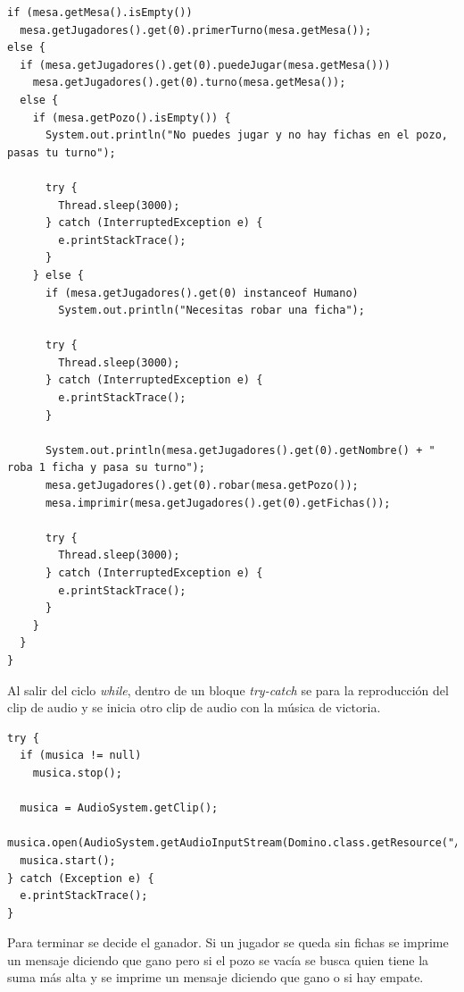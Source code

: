 \documentclass[12pt]{article}
\begin{document}
  \begin{lstlisting}
if (mesa.getMesa().isEmpty())
  mesa.getJugadores().get(0).primerTurno(mesa.getMesa());
else {
  if (mesa.getJugadores().get(0).puedeJugar(mesa.getMesa())) 
    mesa.getJugadores().get(0).turno(mesa.getMesa());
  else { 
    if (mesa.getPozo().isEmpty()) { 
      System.out.println("No puedes jugar y no hay fichas en el pozo, pasas tu turno");

      try {
        Thread.sleep(3000);
      } catch (InterruptedException e) {
        e.printStackTrace();
      }
    } else {
      if (mesa.getJugadores().get(0) instanceof Humano)
        System.out.println("Necesitas robar una ficha");

      try {
        Thread.sleep(3000);
      } catch (InterruptedException e) {
        e.printStackTrace();
      }

      System.out.println(mesa.getJugadores().get(0).getNombre() + " roba 1 ficha y pasa su turno");
      mesa.getJugadores().get(0).robar(mesa.getPozo());
      mesa.imprimir(mesa.getJugadores().get(0).getFichas());

      try {
        Thread.sleep(3000);
      } catch (InterruptedException e) {
        e.printStackTrace();
      }
    }
  }
}
  \end{lstlisting}

  Al salir del ciclo \textit{while}, dentro de un bloque \textit{try-catch} se para la reproducción del clip de audio y se inicia otro clip de audio con la música de victoria. 

  \begin{lstlisting}
try {
  if (musica != null)
    musica.stop();
  
  musica = AudioSystem.getClip();
  musica.open(AudioSystem.getAudioInputStream(Domino.class.getResource("/recursos/Victoria.wav")));
  musica.start();
} catch (Exception e) {
  e.printStackTrace();
}        
  \end{lstlisting}

  Para terminar se decide el ganador. Si un jugador se queda sin fichas se imprime un mensaje diciendo que gano pero si el pozo se vacía se busca quien tiene la suma más alta y se imprime un mensaje diciendo que gano o si hay empate.
\end{document}
